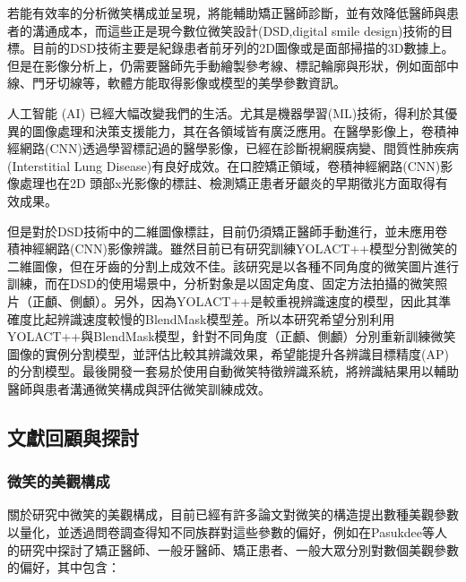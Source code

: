 若能有效率的分析微笑構成並呈現，將能輔助矯正醫師診斷，並有效降低醫師與患者的溝通成本，而這些正是現今數位微笑設計(DSD,digital smile design)技術的目標。目前的DSD技術主要是紀錄患者前牙列的2D圖像或是面部掃描的3D數據上。但是在影像分析上，仍需要醫師先手動繪製參考線、標記輪廓與形狀，例如面部中線、門牙切線等，軟體方能取得影像或模型的美學參數資訊。

人工智能 (AI) 已經大幅改變我們的生活。尤其是機器學習(ML)技術，得利於其優異的圖像處理和決策支援能力，其在各領域皆有廣泛應用。在醫學影像上，卷積神經網路(CNN)透過學習標記過的醫學影像，已經在診斷視網膜病變、間質性肺疾病(Interstitial Lung Disease)有良好成效。在口腔矯正領域，卷積神經網路(CNN)影像處理也在2D 頭部x光影像的標註、檢測矯正患者牙齦炎的早期徵兆方面取得有效成果。

但是對於DSD技術中的二維圖像標註，目前仍須矯正醫師手動進行，並未應用卷積神經網路(CNN)影像辨識。雖然目前已有研究訓練YOLACT++模型分割微笑的二維圖像，但在牙齒的分割上成效不佳。該研究是以各種不同角度的微笑圖片進行訓練，而在DSD的使用場景中，分析對象是以固定角度、固定方法拍攝的微笑照片（正顱、側顱）。另外，因為YOLACT++是較重視辨識速度的模型，因此其準確度比起辨識速度較慢的BlendMask模型差。所以本研究希望分別利用YOLACT++與BlendMask模型，針對不同角度（正顱、側顱）分別重新訓練微笑圖像的實例分割模型，並評估比較其辨識效果，希望能提升各辨識目標精度(AP)的分割模型。最後開發一套易於使用自動微笑特徵辨識系統，將辨識結果用以輔助醫師與患者溝通微笑構成與評估微笑訓練成效。



\subsection{文獻回顧與探討}
\subsubsection{微笑的美觀構成}

關於研究中微笑的美觀構成，目前已經有許多論文對微笑的構造提出數種美觀參數以量化，並透過問卷調查得知不同族群對這些參數的偏好，例如在Pasukdee等人的研究中探討了矯正醫師、一般牙醫師、矯正患者、一般大眾分別對數個美觀參數的偏好，其中包含：\\




